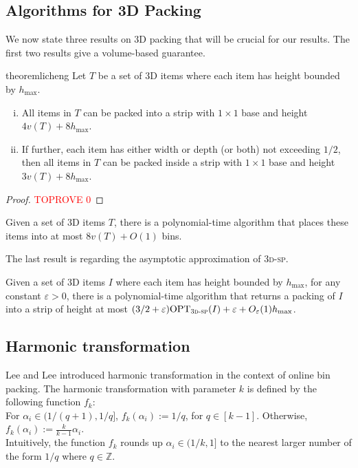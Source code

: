 \documentclass[a4paper,UKenglish,cleveref, autoref, thm-restate]{lipics-v2021}
\newcommand{\eps}{\varepsilon}
\newcommand{\opt}{\mathrm{OPT}}
\newcommand{\tsp}{\textsc{3d-sp}\xspace}
\begin{document}
\subsection{Algorithms for 3D Packing}
We now state three results on 3D packing that will be crucial for our results.
The first two results give a volume-based guarantee.


\begin{restatable}{theorem}{licheng}
\label{thm:licheng}
    Let $T$ be a set of 3D items where each item has height bounded by $h_{\max}$. 
    \begin{enumerate}[(i)]
        \item All items in $T$ can be packed into a strip with $1\times 1$ base and height $4v(T) + 8h_{\max}$.
        \item If further, each item has either width or depth (or both) not exceeding $1/2$, then all items in $T$ can be packed inside a strip with $1\times 1$ base and height $3v(T)+8h_{\max}$.
    \end{enumerate}
\end{restatable}


\begin{proof}\textcolor{red}{TOPROVE 0}\end{proof}

\begin{theorem}
\label{thm:volume-packing}
    Given a set of 3D items $T$, there is a polynomial-time algorithm that places these items into at most $8v(T) + O(1)$ bins.
\end{theorem}

The last result is regarding the asymptotic approximation of \tsp. 

\begin{theorem}
\label{thm:jpstrippacking}
    Given a set of 3D items $I$ where each item has height bounded by $h_{\max}$, for any constant $\eps >0$, there is a polynomial-time algorithm that returns a packing of $I$ into a strip of height at most $(3/2+\varepsilon)\opt_{\tsp}(I)+\varepsilon + O_{\varepsilon}(1)h_{\max}$.
\end{theorem}

\subsection{Harmonic transformation}
\label{subsec:harmonic}
Lee and Lee \cite{LeeL85} introduced harmonic transformation in the context of online bin packing. 
The harmonic transformation with parameter $k$ is defined by the following function $f_k$:\\
For $\alpha_i\in(1/(q+1),1/q]$,  $f_k(\alpha_i):=1/q$, for $q \in [k-1]$.
Otherwise, $f_k(\alpha_i):=\frac{k}{k-1}\alpha_i$.\\
Intuitively, the function $f_k$ rounds up $\alpha_i\in(1/k,1]$
to the nearest larger number of the form $1/q$ where $q\in \mathbb{Z}$. 
\end{document}
